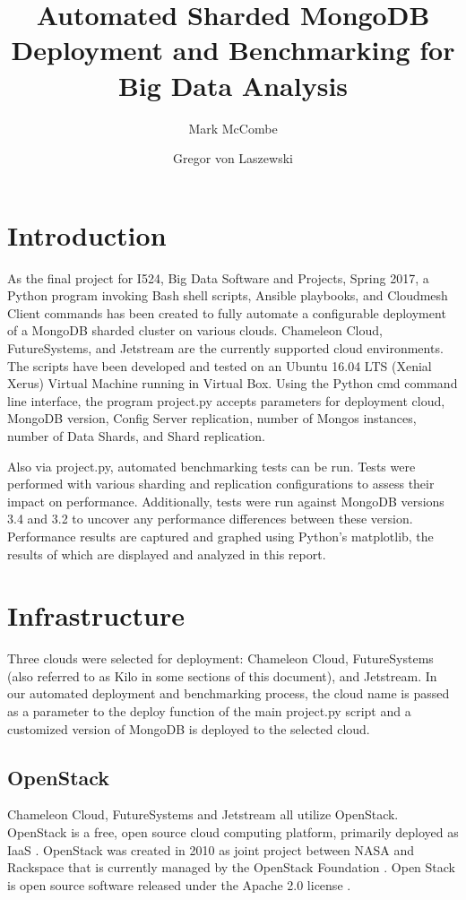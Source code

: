 \documentclass[9pt,twocolumn,twoside]{../../styles/osajnl}
\title{Automated Sharded MongoDB Deployment and Benchmarking for Big Data Analysis}
\author[1,*]{Mark McCombe}
\author[1,*]{Gregor von Laszewski}
\affil[1]{School of Informatics and Computing, Bloomington, IN 47408, U.S.A.}
\affil[*]{Corresponding author: mmccombe@iu.edu}
\begin{document}
\maketitle

\section{Introduction}

As the final project for I524, Big Data Software and Projects, Spring
2017, a Python program invoking Bash shell scripts, Ansible playbooks,
and Cloudmesh Client commands has been created to fully automate a
configurable deployment of a MongoDB sharded cluster on various
clouds. Chameleon Cloud, FutureSystems, and Jetstream are the
currently supported cloud environments. The scripts have been
developed and tested on an Ubuntu 16.04 LTS (Xenial Xerus) Virtual
Machine running in Virtual Box. Using the Python cmd command line
interface, the program project.py accepts parameters for deployment
cloud, MongoDB version, Config Server replication, number of Mongos
instances, number of Data Shards, and Shard replication.

Also via project.py, automated benchmarking tests can be run. Tests
were performed with various sharding and replication configurations to
assess their impact on performance. Additionally, tests were run
against MongoDB versions 3.4 and 3.2 to uncover any performance
differences between these version. Performance results are captured
and graphed using Python's matplotlib, the results of which are
displayed and analyzed in this report.

\section{Infrastructure}

Three clouds were selected for deployment: Chameleon Cloud,
FutureSystems (also referred to as Kilo in some sections of this
document), and Jetstream. In our automated deployment and benchmarking
process, the cloud name is passed as a parameter to the deploy
function of the main project.py script and a customized version of
MongoDB is deployed to the selected cloud.

\subsection{OpenStack}

Chameleon Cloud, FutureSystems and Jetstream all utilize OpenStack.
OpenStack is a free, open source cloud computing platform, primarily
deployed as IaaS \cite{www-wikiOpenStack}. OpenStack was created in
2010 as joint project between NASA and Rackspace that is currently
managed by the OpenStack Foundation \cite{www-wikiOpenStack}. Open
Stack is open source software released under the Apache 2.0 license
\cite{www-openStackFAQ}.
\end{document}
